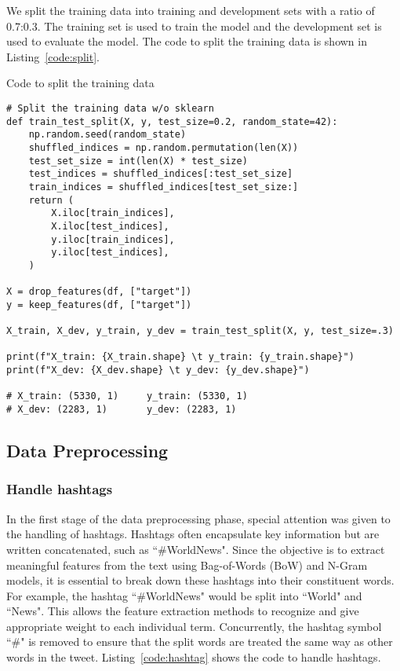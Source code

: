 \documentclass{article}
\begin{document}
We split the training data into training and development sets with a ratio of 0.7:0.3. The training set is used to train the model and the development set is used to evaluate the model. The code to split the training data is shown in Listing~\ref{code:split}.

\begin{listing}[H]
\caption{Code to split the training data}
\label{code:split}
\begin{verbatim}
# Split the training data w/o sklearn
def train_test_split(X, y, test_size=0.2, random_state=42):
    np.random.seed(random_state)
    shuffled_indices = np.random.permutation(len(X))
    test_set_size = int(len(X) * test_size)
    test_indices = shuffled_indices[:test_set_size]
    train_indices = shuffled_indices[test_set_size:]
    return (
        X.iloc[train_indices],
        X.iloc[test_indices],
        y.iloc[train_indices],
        y.iloc[test_indices],
    )
    
X = drop_features(df, ["target"])
y = keep_features(df, ["target"])

X_train, X_dev, y_train, y_dev = train_test_split(X, y, test_size=.3)

print(f"X_train: {X_train.shape} \t y_train: {y_train.shape}")
print(f"X_dev: {X_dev.shape} \t y_dev: {y_dev.shape}")

# X_train: (5330, 1) 	 y_train: (5330, 1)
# X_dev: (2283, 1) 	     y_dev: (2283, 1)
\end{verbatim}
\end{listing}

\subsection{Data Preprocessing}

\subsubsection{Handle hashtags}

In the first stage of the data preprocessing phase, special attention was given to the handling of hashtags. Hashtags often encapsulate key information but are written concatenated, such as “\#WorldNews". Since the objective is to extract meaningful features from the text using Bag-of-Words (BoW) and N-Gram models, it is essential to break down these hashtags into their constituent words. For example, the hashtag “\#WorldNews" would be split into “World" and “News". This allows the feature extraction methods to recognize and give appropriate weight to each individual term. Concurrently, the hashtag symbol “\#" is removed to ensure that the split words are treated the same way as other words in the tweet. Listing~\ref{code:hashtag} shows the code to handle hashtags.
\end{document}
